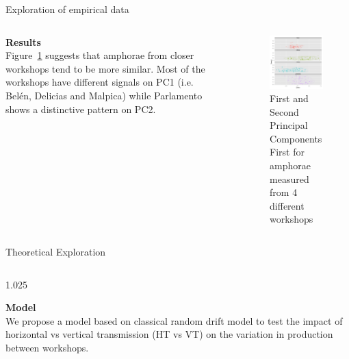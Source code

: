 \documentclass[final]{beamer}
\newlength{\sepwid}
\newlength{\onecolwid}
\newlength{\twocolwid}
\begin{document}
\begin{frame}[t]
\begin{columns}[t]
\begin{column}{\twocolwid}
\begin{block}{Exploration of empirical data}
\begin{columns}[t,totalwidth=\twocolwid]
\begin{column}{\onecolwid}
\vspace{1cm}
{\textbf{Results}}\\
\justify
Figure~\ref{fig:pca} suggests that amphorae from closer workshops tend to be more similar. Most of the workshops have different signals on PC1 (i.e. Bel\'en, Delicias and Malpica) while Parlamento shows a distinctive pattern on PC2.


\end{column}

\begin{column}{\sepwid}\end{column} %

\begin{column}{\onecolwid} %


\begin{figure}
\includegraphics[width=0.6\linewidth]{images/fig2.png}
\singlespace
\caption{First and Second Principal Components First for amphorae measured from 4 different workshops}
\label{fig:pca}
\end{figure}

\end{column}
\end{columns}

\end{block}

\begin{block}{Theoretical Exploration}

\begin{columns}[t,totalwidth=\twocolwid]

\begin{column}{1.025\onecolwid} %

{\textbf{Model }}\\
\justify
We propose a model based on classical random drift model to test the impact of horizontal vs vertical transmission (HT vs VT) on the variation in production between workshops.  %


\end{column}
\end{columns}
\end{block}
\end{column}
\end{columns}
\end{frame}
\end{document}
